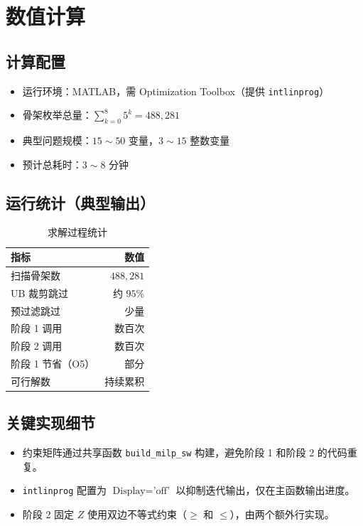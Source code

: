 \documentclass[12pt,a4paper]{ctexart}
\theoremstyle{definition}
\begin{document}
\section{数值计算}

\subsection{计算配置}

\begin{itemize}
  \item 运行环境：MATLAB，需 Optimization Toolbox（提供 \texttt{intlinprog}）
  \item 骨架枚举总量：$\sum_{k=0}^8 5^k = 488{,}281$
  \item 典型问题规模：$15\sim 50$ 变量，$3\sim 15$ 整数变量
  \item 预计总耗时：$3\sim 8$ 分钟
\end{itemize}

\subsection{运行统计（典型输出）}

\begin{table}[H]
  \centering
  \caption{求解过程统计}
  \begin{tabular}{lr}
    \toprule
    指标 & 数值 \\
    \midrule
    扫描骨架数      & $488{,}281$ \\
    UB 裁剪跳过    & 约 $95\%$ \\
    预过滤跳过      & 少量 \\
    阶段 1 调用    & 数百次 \\
    阶段 2 调用    & 数百次 \\
    阶段 1 节省（O5）& 部分 \\
    可行解数        & 持续累积 \\
    \bottomrule
  \end{tabular}
\end{table}

\subsection{关键实现细节}

\begin{itemize}
  \item 约束矩阵通过共享函数 \texttt{build\_milp\_sw} 构建，避免阶段 1 和阶段 2 的代码重复。
  \item \texttt{intlinprog} 配置为 $\text{Display}=\text{'off'}$ 以抑制迭代输出，仅在主函数输出进度。
  \item 阶段 2 固定 $Z$ 使用双边不等式约束（$\ge$ 和 $\le$），由两个额外行实现。
\end{itemize}
\end{document}
